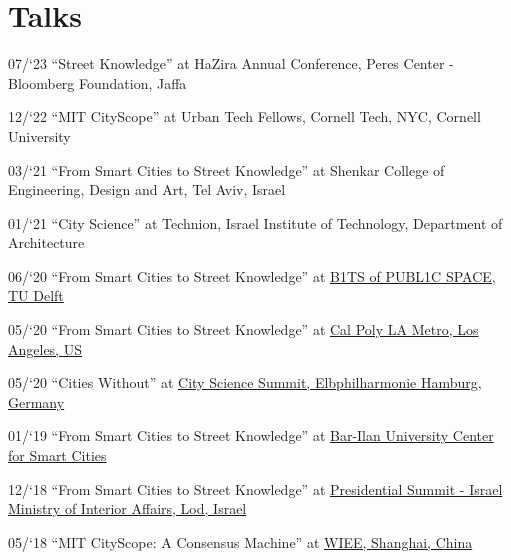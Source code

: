 \section*{Talks}

\begin{tablist}

    \item[07/`23] \tab \enquote{Street Knowledge} at
    {HaZira Annual Conference, Peres Center - Bloomberg Foundation, Jaffa}
    
    \item[12/`22] \tab \enquote{MIT CityScope} at
    {Urban Tech Fellows, Cornell Tech, NYC, Cornell University}

    \item[03/`21] \tab \enquote{From Smart Cities to Street Knowledge} at
    {Shenkar College of Engineering, Design and Art, Tel Aviv, Israel}

    \item[01/`21] \tab \enquote{City Science} at
    {Technion, Israel Institute of Technology, Department of Architecture}

    \item[06/`20] \tab \enquote{From Smart Cities to Street Knowledge} at
    \href{http://www.polistudelft.nl/urbanism-week/b1ts-of-publ1c-space-3-0/}{B1TS of PUBL1C SPACE, TU Delft}

    \item[05/`20] \tab \enquote{From Smart Cities to Street Knowledge} at
    \href{https://www.youtube.com/watch?v=Rh5ks9x3720}{Cal Poly LA Metro, Los Angeles, US}

    \item[05/`20] \tab \enquote{Cities Without} at
    \href{https://www.youtube.com/watch?v=PZg6A_A65lQ}{City Science Summit, Elbphilharmonie Hamburg, Germany}

    \item[01/`19] \tab \enquote{From Smart Cities to Street Knowledge} at
    \href{https://law.biu.ac.il/sites/law/files/shared/mrym_khkmvt_lkhkmt_hrkhvb.pdf}{
        Bar-Ilan University Center for Smart Cities}

    \item[12/`18] \tab \enquote{From Smart Cities to Street Knowledge} at
    \href{https://www.youtube.com/watch?v=skIEkM9-1yg}{Presidential Summit - Israel Ministry of Interior Affairs, Lod, Israel}

    \item[05/`18] \tab \enquote{MIT CityScope: A Consensus Machine} at
    \href{https://wiee.tongji.edu.cn/CSS2018/}{WIEE, Shanghai, China}


\end{tablist}
